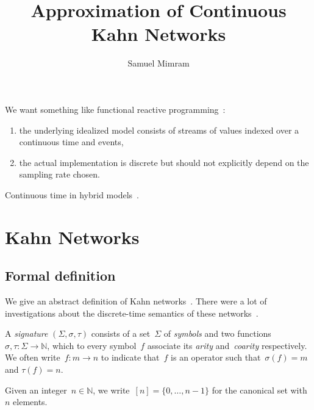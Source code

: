 \documentclass{article}
\title{Approximation of Continuous Kahn Networks}
\author{Samuel Mimram}
\newcommand{\N}{\mathbb{N}}
\newcommand{\intset}[1]{[#1]}
\begin{document}
\maketitle

We want something like functional reactive
programming~\cite{elliott1997functional}:
\begin{enumerate}
\item the underlying idealized model consists of streams of values indexed over
  a continuous time and events,
\item the actual implementation is discrete but should not explicitly depend on
  the sampling rate chosen.
\end{enumerate}

Continuous time in hybrid models~\cite{liu:causality-hybrid}.


\section{Kahn Networks}
\subsection{Formal definition}
We give an abstract definition of Kahn
networks~\cite{kahn:semantics-parallel}. There were a lot of investigations
about the discrete-time semantics of these
networks~\cite{hildebrandt2004relational, ...}.

A \emph{signature} $(\Sigma,\sigma,\tau)$ consists of a set~$\Sigma$ of
\emph{symbols} and two functions \hbox{$\sigma,\tau:\Sigma\to\N$}, which to
every symbol~$f$ associate its \emph{arity} and~\emph{coarity} respectively. We
often write~$f:m\to n$ to indicate that~$f$ is an operator such that~$\sigma(f)=m$
and \hbox{$\tau(f)=n$}.

Given an integer~$n\in\N$, we write~$\intset{n}=\{0,\ldots,n-1\}$ for the
canonical set with~$n$ elements.
\end{document}
